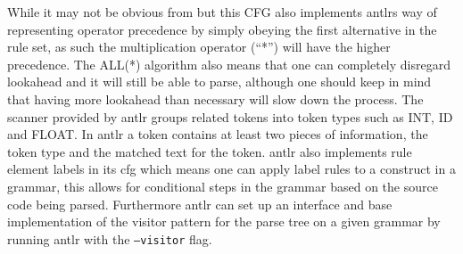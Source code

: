While it may not be obvious from  but this CFG also implements \acrshort{antlr}s way of representing operator precedence by simply obeying the first alternative in the rule set, as such the multiplication operator (``*'') will have the higher precedence.
The ALL(*) algorithm also means that one can completely disregard lookahead and it will still be able to parse, although one should keep in mind that having more lookahead than necessary will slow down the process.
The scanner provided by \acrshort{antlr} groups related tokens into token types such as INT, ID and FLOAT.
In \acrshort{antlr} a token contains at least two pieces of information, the token type and the matched text for the token.
\acrshort{antlr} also implements rule element labels in its \acrfull{cfg} which means one can apply label rules to a construct in a grammar, this allows for conditional steps in the grammar based on the source code being parsed.
Furthermore \acrshort{antlr} can set up an interface and base implementation of the visitor pattern for the parse tree on a given grammar by running \acrshort{antlr} with the \texttt{--visitor} flag.\citep{ALLSTAR, LLSTAR, antlr4_Book}


